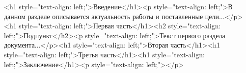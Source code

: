 \documentclass[paper=a4, fontsize=14pt, pagesize, DIV=calc, oneside]{scrreport}
\begin{document}
\pagestyle{plain}
\setcounter{page}{2}

\newpage
\tableofcontents
\newpage

<h1 style="text-align: left;">Введение</h1><p style="text-align: left;">В данном разделе описывается актуальность работы и поставленные цели...</p><h1 style="text-align: left;">Первая часть</h1><h2 style="text-align: left;">Подпункт</h2><p style="text-align: left;">Текст первого раздела документа...</p><h1 style="text-align: left;">Вторая часть</h1><h1 style="text-align: left;">Третья часть</h1><h1 style="text-align: left;">Заключение</h1><p style="text-align: left;"></p>
\end{document}
